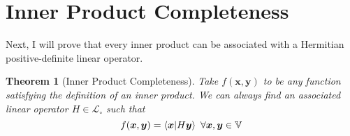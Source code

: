 \documentclass{article}
\newcommand{\B}[1]{\boldsymbol{#1}}
\newtheorem{theorem}{Theorem}[section]
\theoremstyle{definition}
\theoremstyle{remark}
\begin{document}





\pagebreak  
\section{Inner Product Completeness}
Next, I will prove that every inner product can be associated with a Hermitian positive-definite linear operator.

\begin{theorem}[Inner Product Completeness]
  Take $f(\B{x}, \B{y})$ to be any function satisfying
  the definition of an inner product. We can always find an associated
  linear operator $H \in \mathcal{L}_\circ$ such that
  \begin{equation}
    f(\B{x},\B{y}) = \braket{\B{x}|H\B{y}} ~ \forall \B{x}, \B{y} \in \mathbb{V}
  \end{equation}
\end{theorem}
\end{document}
